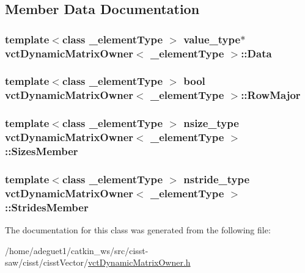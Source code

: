 \subsection{Member Data Documentation}
\hypertarget{classvct_dynamic_matrix_owner_a5bbb48bdf7525decefe9b415c0ddc3b9}{
\subsubsection[{Data}]{\setlength{\rightskip}{0pt plus 5cm}template$<$class \-\_\-element\-Type $>$ value\-\_\-type$\ast$ {\bf vct\-Dynamic\-Matrix\-Owner}$<$ \-\_\-element\-Type $>$\-::Data\hspace{0.3cm}{\ttfamily [protected]}}}\label{classvct_dynamic_matrix_owner_a5bbb48bdf7525decefe9b415c0ddc3b9}
\hypertarget{classvct_dynamic_matrix_owner_a5f3826269134e26c85b4ef66a2667c18}{
\subsubsection[{Row\-Major}]{\setlength{\rightskip}{0pt plus 5cm}template$<$class \-\_\-element\-Type $>$ bool {\bf vct\-Dynamic\-Matrix\-Owner}$<$ \-\_\-element\-Type $>$\-::Row\-Major\hspace{0.3cm}{\ttfamily [protected]}}}\label{classvct_dynamic_matrix_owner_a5f3826269134e26c85b4ef66a2667c18}
\hypertarget{classvct_dynamic_matrix_owner_a097dc19836d0b333289b633b9825d079}{
\subsubsection[{Sizes\-Member}]{\setlength{\rightskip}{0pt plus 5cm}template$<$class \-\_\-element\-Type $>$ nsize\-\_\-type {\bf vct\-Dynamic\-Matrix\-Owner}$<$ \-\_\-element\-Type $>$\-::Sizes\-Member\hspace{0.3cm}{\ttfamily [protected]}}}\label{classvct_dynamic_matrix_owner_a097dc19836d0b333289b633b9825d079}
\hypertarget{classvct_dynamic_matrix_owner_ab172c2ecf28deae244fb5f776dad0bef}{
\subsubsection[{Strides\-Member}]{\setlength{\rightskip}{0pt plus 5cm}template$<$class \-\_\-element\-Type $>$ nstride\-\_\-type {\bf vct\-Dynamic\-Matrix\-Owner}$<$ \-\_\-element\-Type $>$\-::Strides\-Member\hspace{0.3cm}{\ttfamily [protected]}}}\label{classvct_dynamic_matrix_owner_ab172c2ecf28deae244fb5f776dad0bef}


The documentation for this class was generated from the following file\-:\begin{DoxyCompactItemize}
\item 
/home/adeguet1/catkin\-\_\-ws/src/cisst-\/saw/cisst/cisst\-Vector/\hyperlink{vct_dynamic_matrix_owner_8h}{vct\-Dynamic\-Matrix\-Owner.\-h}\end{DoxyCompactItemize}
